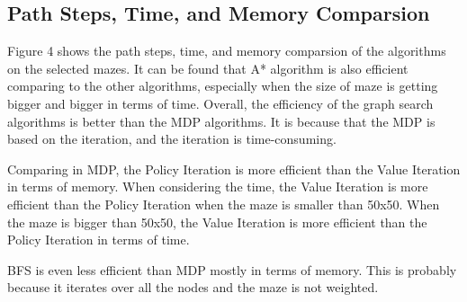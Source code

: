 \documentclass{article}
\begin{document}
\subsection{Path Steps, Time, and Memory Comparsion}
Figure 4 shows the path steps, time, and memory comparsion of the algorithms on the selected mazes.
It can be found that A* algorithm is also efficient comparing to the other algorithms, especially when the size of maze is getting bigger and bigger in terms of time.
Overall, the efficiency of the graph search algorithms is better than the MDP algorithms.
It is because that the MDP is based on the iteration, and the iteration is time-consuming.

Comparing in MDP, the Policy Iteration is more efficient than the Value Iteration in terms of memory.
When considering the time, the Value Iteration is more efficient than the Policy Iteration when the maze is smaller than 50x50.
When the maze is bigger than 50x50, the Value Iteration is more efficient than the Policy Iteration in terms of time.

BFS is even less efficient than MDP mostly in terms of memory. This is probably because it iterates over all the nodes and the maze is not weighted.
\end{document}
